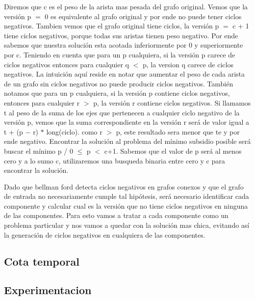 Diremos que c es el peso de la arista mas pesada del grafo original. Vemos que la versión p $=$ 0 es equivalente al grafo original y por ende no puede tener ciclos negativos. Tambien vemos que el grafo original tiene ciclos, la versión p $=$ c + 1 tiene ciclos negativos, porque todas sus aristas tienen peso negativo. Por ende sabemos que nuestra solución esta acotada inferiormente por 0 y superiormente por c. Teniendo en cuenta que para un p cualquiera, si la versión p carece de ciclos negativos entonces para cualquier q $<$ p, la version q carece de ciclos negativos. La intuición aquí reside en notar que aumentar el peso de cada arista de un grafo sin ciclos negativos no puede producir ciclos negativos. También notamos que para un p cualquiera, si la versión p contiene ciclos negativos, entonces para cualquier r $>$ p, la versión r contiene ciclos negativos. Si llamamos t al peso de la suma de los ejes que pertenecen a cualquier ciclo negativo de la versión p, vemos que la suma correspondiente en la versión r será de valor igual a t + (p $-$ r) $\ast$ long(ciclo). como r $>$ p, este resultado sera menor que te y por ende negativo. Encontrar la solución al problema del mínimo subsidio posible será buscar el mínimo p / 0 $\leq$ p $<$ c+1. Sabemos que el valor de p será al menos cero y a lo sumo c, utilizaremos una busqueda binaria entre cero y c para encontrar la solución.
\\
\par
Dado que bellman ford detecta ciclos negativos en grafos conexos y que el grafo de entrada no necesariamente cumple tal hipótesis, será necesario identificar cada componente y calcular cual es la versión que no tiene ciclos negativos en ninguna de las componentes. Para esto vamos a tratar a cada componente como un problema particular y nos vamos a quedar con la solución mas chica, evitando así la generación de ciclos negativos en cualquiera de las componentes.
\subsection{Cota temporal}

\subsection{Experimentacion}

\pagebreak



 



